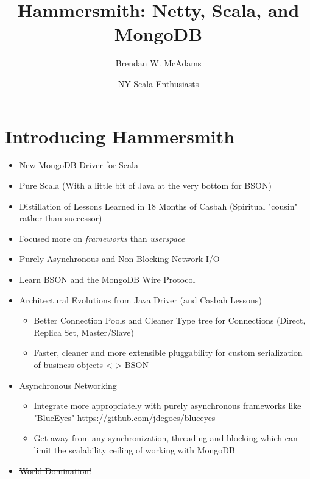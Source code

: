 \documentclass[xcolor=dvipsnames]{beamer}
\title{Hammersmith: Netty, Scala, and MongoDB} %
\institute[10gen, Inc.]{10gen, Inc.}
\author[B.W. McAdams]{Brendan W. McAdams}
\date{NY Scala Enthusiasts}
\newenvironment{itemizeframe}
               {\begin{frame}\startitemizeframe} 
               {\stopitemizeframe\end{frame}}
\newcommand\startitemizeframe{\begin{itemize}} \newcommand\stopitemizeframe{\end{itemize}}
\begin{document}
\begin{frame}
  \titlepage
\end{frame}

\section{Introducing Hammersmith}


\begin{itemizeframe}
    \frametitle{What is Hammersmith?}
    \framesubtitle{Overview}
    \item New MongoDB Driver for Scala 
    \item Pure Scala (With a little bit of Java at the very bottom for BSON)
    \item Distillation of Lessons Learned in 18 Months of Casbah (Spiritual "cousin" rather than successor)
    \item Focused more on \textit{frameworks} than \textit{userspace}
    \item Purely Asynchronous and Non-Blocking Network I/O
\end{itemizeframe}

\begin{itemizeframe}
    \frametitle{Why Hammersmith?}
    \framesubtitle{What Problems Does It Solve/Explore?}
    \item Learn BSON and the MongoDB Wire Protocol
    \item Architectural Evolutions from Java Driver (and Casbah Lessons)
        \begin{itemize} 
            \item Better Connection Pools and Cleaner Type tree for Connections (Direct, Replica Set, Master/Slave)
            \item Faster, cleaner and more extensible pluggability for custom serialization of business objects <-> BSON
        \end{itemize}
    \item Asynchronous Networking
        \begin{itemize}
            \item Integrate more appropriately with purely asynchronous frameworks like "BlueEyes" \url{https://github.com/jdegoes/blueeyes}
            \item Get away from any synchronization, threading and blocking which can limit the scalability ceiling of working with MongoDB
        \end{itemize}
    \item \sout{World Domination!}
\end{itemizeframe}
\end{document}
